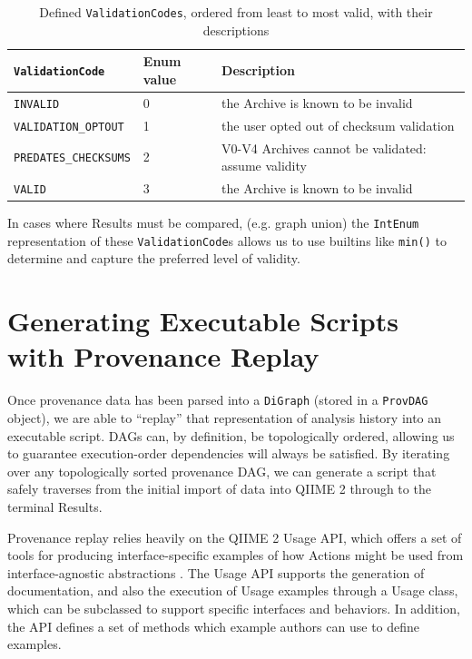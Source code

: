 \begin{table}[htp]
    \centering
    \begin{tabular}{|p{}|p{}|p{}|}
    \hline
    \texttt{ValidationCode}      & Enum value & Description                                          \\ \hline
    \texttt{INVALID}             & 0          & the Archive is known to be invalid                   \\
    \texttt{VALIDATION\_OPTOUT}  & 1          & the user opted out of checksum validation            \\
    \texttt{PREDATES\_CHECKSUMS} & 2          & V0-V4 Archives cannot be validated: assume validity  \\
    \texttt{VALID}               & 3          & the Archive is known to be invalid                   \\ \hline
    \end{tabular}
    \caption[Defined ValidationCodes, ordered from least to most valid, with their descriptions]%
    {Defined \texttt{ValidationCodes}, ordered from least to most valid, with their descriptions}
    \label{tab:validationCodes}
\end{table}

\noindent In cases where Results must be compared, (e.g. graph union) the \texttt{IntEnum}
representation of these \texttt{ValidationCode}s allows us to use builtins like \texttt{min()} to
determine and capture the preferred level of validity.


\section{Generating Executable Scripts with Provenance Replay}

Once provenance data has been parsed into a \texttt{DiGraph} (stored in a \texttt{ProvDAG}
object), we are able to “replay” that representation of analysis history into an
executable script. DAGs can, by definition, be topologically ordered, allowing
us to guarantee execution-order dependencies will always be satisfied. By
iterating over any topologically sorted provenance DAG, we can generate a script
that safely traverses from the initial import of data into QIIME 2 through to
the terminal Results.

Provenance replay relies heavily on the QIIME 2 Usage API, which offers a set of
tools for producing interface-specific examples of how Actions might be used
from interface-agnostic abstractions \parencite{qiime_2_development_team_usage_2018}.
The Usage API supports the generation of documentation, and also the execution
of Usage examples through a Usage class, which can be subclassed to support
specific interfaces and behaviors. In addition, the API defines a set of methods
which example authors can use to define examples.

